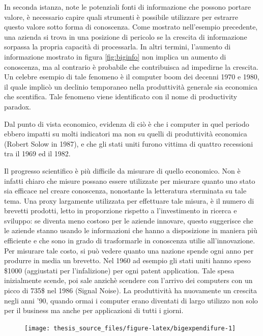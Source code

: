 \documentclass[]{book}
\begin{document}
In seconda istanza, note le potenziali fonti di informazione che possono
portare valore, è necessario capire quali strumenti è possibile
utilizzare per estrarre questo valore sotto forma di conoscenza. Come
mostrato nell'esempio precedente, una azienda si trova in una posizione
di pericolo se la crescita di informazione sorpassa la propria capacità
di processarla. In altri termini, l'aumento di informazione mostrato in
figura \ref{fig:biginfo} non implica un aumento di conoscenza, ma al
contrario è probabile che contribuisca ad impedirne la crescita. Un
celebre esempio di tale fenomeno è il computer boom dei decenni 1970 e
1980, il quale implicò un declinio temporaneo nella produttività
generale sia economica che scentifica. Tale fenomeno viene identificato
con il nome di productivity paradox.

Dal punto di vista economico, evidenza di ciò è che i computer in quel
periodo ebbero impatti su molti indicatori ma non su quelli di
produttività economica (Robert Solow in 1987), e che gli stati uniti
furono vittima di quattro recessioni tra il 1969 ed il 1982.

Il progresso scientifico è più difficile da misurare di quello
economico. Non è infatti chiaro che misure possano essere utilizzate per
misurare quanto uno stato sia efficace nel creare conoscenza, nonostante
la letteratura sterminata su tale tema. Una proxy largamente utilizzata
per effettuare tale misura, è il numero di brevetti prodotti, letto in
proporzione rispetto a l'investimento in ricerca e sviluppo: se diventa
meno costoso per le aziende innovare, questo suggerisce che le aziende
stanno usando le informazioni che hanno a disposizione in maniera più
efficiente e che sono in grado di trasformarle in conoscenza utilie
all'innovazione. Per misurare tale costo, si può vedere quanto una
nazione spende ogni anno per produrre in media un brevetto. Nel 1960 ad
esempio gli stati uniti hanno speso \$1000 (aggiustati per
l'infalizione) per ogni patent application. Tale spesa inizialmente
scende, poi sale anzichè scendere con l'arrivo dei computers con un
picco di 735\$ nel 1986 (Signal Noise). La produttività ha nuovamente un
crescita negli anni '90, quando ormai i computer erano diventati di
largo utilizzo non solo per il business ma anche per applicazioni di
tutti i giorni.

\begin{figure}

{\centering \texttt{[image: thesis\_source\_files/figure-latex/bigexpendifure-1]} 

}

\end{figure}
\end{document}
